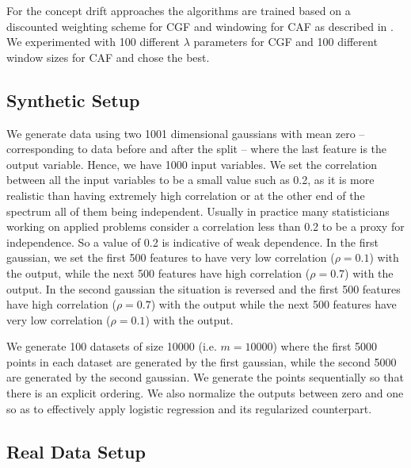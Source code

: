 \documentclass{article}
\begin{document}
For the concept drift approaches the algorithms are trained based on a discounted weighting scheme for CGF and windowing for CAF as described in \cite{cdSurvey}. We experimented with 100 different $\lambda$ parameters for CGF and 100 different window sizes for CAF and chose the best.

\subsection{Synthetic Setup}

We generate data using two 1001 dimensional gaussians with mean zero -- corresponding to data before and after the split -- where the last feature is the output variable. Hence, we have 1000 input variables. We set the correlation between all the input variables to be a small value such as 0.2, as it is more realistic than having extremely high correlation or at the other end of the spectrum all of them being independent. Usually in practice many statisticians working on applied problems consider a correlation less than 0.2 to be a proxy for independence. So a value of 0.2 is indicative of weak dependence. In the first gaussian, we set the first 500 features to have very low correlation ($\rho=0.1$) with the output, while the next 500 features have high correlation ($\rho=0.7$) with the output. In the second gaussian the situation is reversed and the first 500 features have high correlation ($\rho=0.7$) with the output while the next 500 features have very low correlation ($\rho=0.1$) with the output.

We generate 100 datasets of size 10000 (i.e. $m=10000$) where the first 5000 points in each dataset are generated by the first gaussian, while the second 5000 are generated by the second gaussian. We generate the points sequentially so that there is an explicit ordering. We also normalize the outputs between zero and one so as to effectively apply logistic regression and its regularized counterpart.


\subsection{Real Data Setup}
\end{document}
